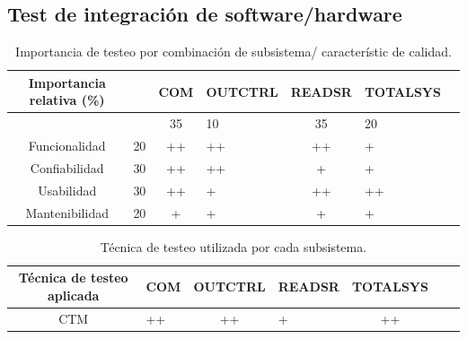 \documentclass[11pt]{article}
\begin{document}
\subsection{Test de integración de software/hardware}
\FloatBarrier
\begin{table}[!ht]
    \centering
    \begin{tabularx}{\linewidth}{@{}|c|X|c|X|c|X|c|@{}}\hline \hline
        \rowcolor[HTML]{d6c6c3}
        Importancia relativa (\%) &    & COM & OUTCTRL & READSR & TOTALSYS \\
        \hline

                                  &    & 35  & 10      & 35     & 20       \\
        Funcionalidad             & 20 & ++  & ++      & ++     & +        \\
        Confiabilidad             & 30 & ++  & ++      & +      & +        \\
        Usabilidad                & 30 & ++  & +       & ++     & ++       \\
        Mantenibilidad            & 20 & +   & +       & +      & +        \\
        \hline
    \end{tabularx}
    \caption{Importancia de testeo por combinación de subsistema/ característic
        de calidad.}
\end{table}

\FloatBarrier
\begin{table}[!ht]
    \centering
    \begin{tabularx}{\linewidth}{@{}|c|X|c|X|c|X|c|@{}}\hline \hline
        \rowcolor[HTML]{d6c6c3}
        Técnica de testeo aplicada & COM & OUTCTRL & READSR & TOTALSYS \\
        \hline
        CTM                        & ++  & ++      & +      & ++       \\
        \hline
    \end{tabularx}
    \caption{Técnica de testeo utilizada por cada subsistema.}
\end{table}

\newpage
\end{document}
